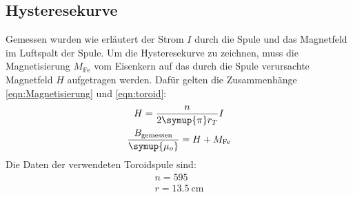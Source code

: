 \subsection{Hysteresekurve}
    Gemessen wurden wie erläutert der Strom $I$ durch die Spule und das Magnetfeld im Luftspalt der Spule. 
    Um die Hysteresekurve zu zeichnen, muss die Magnetisierung $M_\text{Fe}$ vom Eisenkern auf das durch die Spule verursachte 
    Magnetfeld $H$ aufgetragen werden. 
    Dafür gelten die Zusammenhänge \eqref{eqn:Magnetisierung} und \eqref{eqn:toroid}: %
    \begin{gather}
        H=\frac{n}{2\symup{\pi}r_T} I \\
        \frac{B_\text{gemessen}}{\symup{\mu_o}} = H+M_\text{Fe}
        \label{eqn:HystereseE}
    \end{gather}
    Die Daten der verwendeten Toroidspule sind:
    \begin{gather*}
        n=595 \\
        r=\SI{13.5}{\centi\meter}
    \end{gather*}
